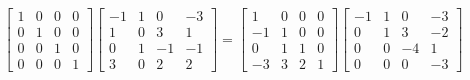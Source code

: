\documentclass[12pt]{article}
\begin{document}
$$
\begin{bmatrix}
1 & 0 & 0 & 0\\
0 & 1 & 0 & 0 \\
0 & 0 & 1 & 0 \\
0 & 0 & 0 & 1
\end{bmatrix}
\begin{bmatrix}
-1 & 1 & 0 & -3\\
1 & 0 & 3 & 1 \\
0 & 1 & -1 & -1 \\
3 & 0 & 2 & 2
\end{bmatrix}
=
\begin{bmatrix}
1 & 0 & 0 & 0\\
-1 & 1 & 0 & 0 \\
0 & 1 & 1 & 0 \\
-3 & 3 & 2 & 1
\end{bmatrix}
\begin{bmatrix}
-1 & 1 & 0 & -3\\
0 & 1 & 3 & -2 \\
0 & 0 & -4 & 1 \\
0 & 0 & 0 & -3
\end{bmatrix}
$$
\end{document}
